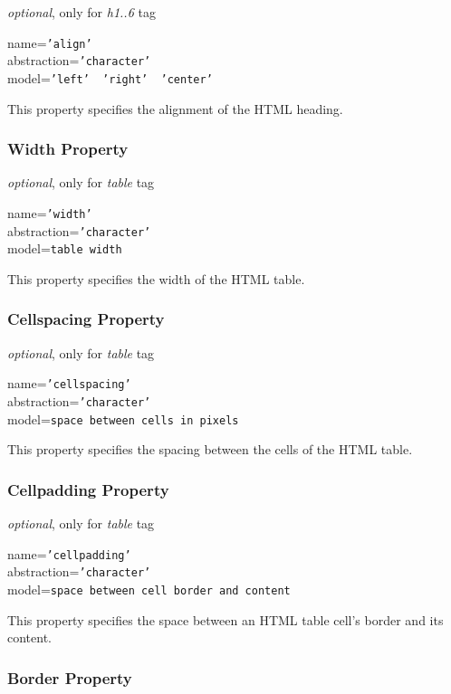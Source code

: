 \emph{optional}, only for \emph{h1..6} tag

name=\texttt{'align'}\\
abstraction=\texttt{'character'}\\
model=\texttt{'left' \vline\ 'right' \vline\ 'center'}

This property specifies the alignment of the HTML heading.

\subsubsection{Width Property}

\emph{optional}, only for \emph{table} tag

name=\texttt{'width'}\\
abstraction=\texttt{'character'}\\
model=\texttt{table width}

This property specifies the width of the HTML table.

\subsubsection{Cellspacing Property}

\emph{optional}, only for \emph{table} tag

name=\texttt{'cellspacing'}\\
abstraction=\texttt{'character'}\\
model=\texttt{space between cells in pixels}

This property specifies the spacing between the cells of the HTML table.

\subsubsection{Cellpadding Property}

\emph{optional}, only for \emph{table} tag

name=\texttt{'cellpadding'}\\
abstraction=\texttt{'character'}\\
model=\texttt{space between cell border and content}

This property specifies the space between an HTML table cell's border and its
content.

\subsubsection{Border Property}


